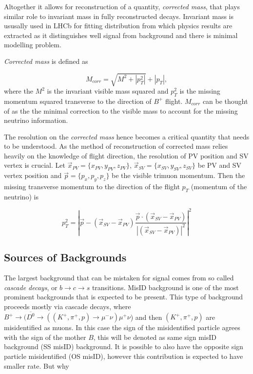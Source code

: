 Altogether it allows for reconstruction of a quantity, \textit{corrected mass}, that plays similar role to invariant mass in fully reconstructed decays. Invariant mass is ususally used in \Gls{LHCb} for fitting distribution from which physics results are extracted as it distinguishes well signal from background and there is minimal modelling problem.

\textit{Corrected mass} is defined as

\begin{equation}
	M_{corr} = \sqrt{{M}^{2} + |p^{2}_{T}|} + |p_{T}|,
\end{equation}	
where the $M^{2}$ is the invariant visible mass squared and $p^{2}_{T}$ is the missing momentum squared transverse to the direction of $B^{+}$ flight.
$M_{corr}$ can be thought of as the the minimal correction to the visible mass to account for the missing neutrino information. 


The resolution on the \textit{corrected mass} hence becomes a critical quantity that needs to be understood. As the method of 
reconstruction of corrected mass relies heavily on the knowledge of \Bpm flight direction, the resolution of \Gls{PV} 
position and \Gls{SV} vertex is crucial. Let $\overrightarrow{{x}}_{PV}=\{x_{PV},y_{PV},z_{PV}\}$, $\overrightarrow{{x}}_{SV}=\{x_{SV},y_{SV},z_{SV}\} $ be \Gls{PV} and \Gls{SV} vertex position and $\overrightarrow{p}=\{p_{x},p_{y},p_{z}\}$ be the visible trimuon momentum. Then the missing transverse momentum to the direction of the flight $p_{T}$ (momentum of the neutrino) is

\begin{equation}
	p^{2}_{T} = |\overrightarrow{p} - (\overrightarrow{{x}}_{SV}-\overrightarrow{{x}}_{PV})\frac{\overrightarrow{p} \cdot(\overrightarrow{{x}}_{SV}-\overrightarrow{{x}}_{PV})}{|(\overrightarrow{{x}}_{SV}-\overrightarrow{{x}}_{PV})|^{2}}|^{2}
\end{equation}

\subsection{Sources of Backgrounds}
The largest background that can be mistaken for signal comes from so called \textit{cascade decays}, or $b \rightarrow c \rightarrow s$ transitions. MisID background is one of the most prominent backgrounds that is expected to be present. This type of background proceeds mostly via cascade decays,
where $B^{+} \rightarrow (\overline{D^{0}} \rightarrow ((K^{+},\pi^{+},p) \rightarrow \mu^{-} \nu) \mu^{+} \nu$) and then $(K^{+},\pi^{+},p)$ are misidentified as muons. In this case
the sign of the misidentified particle agrees with the sign of the mother $B$, this will be denoted as same sign misID background (SS misID) background.
It is possible to also have the opposite sign particle misidentified (OS misID), however this contribution is expected to have smaller rate. But why 
